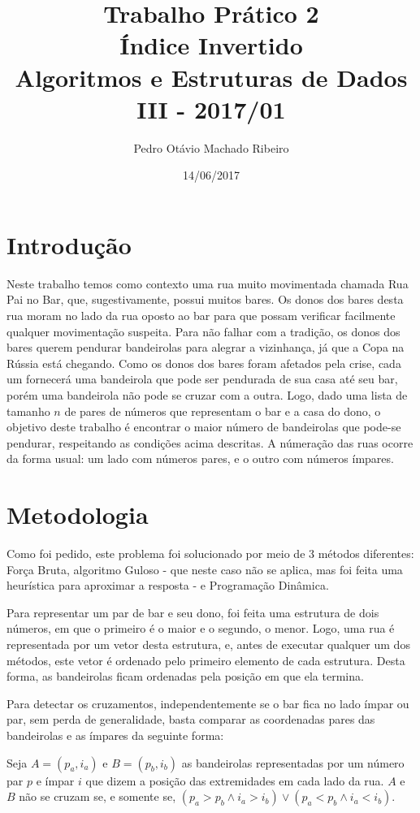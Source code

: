 \documentclass[
	12pt,
	a4paper,
	onepage,
	brazil
]{article}
\author{Pedro Otávio Machado Ribeiro}
\title{Trabalho Prático 2\\Índice Invertido\\Algoritmos e Estruturas de Dados III - 2017/01}
\date{14/06/2017}
\begin{document}
	\maketitle
	
	\section{Introdução}
	
	Neste trabalho temos como contexto uma rua muito movimentada chamada Rua Pai no Bar, que, sugestivamente, possui muitos bares. Os donos dos bares desta rua moram no lado da rua oposto ao bar para que possam verificar facilmente qualquer movimentação suspeita. Para não falhar com a tradição, os donos dos bares querem pendurar bandeirolas para alegrar a vizinhança, já que a Copa na Rússia está chegando. Como os donos dos bares foram afetados pela crise, cada um fornecerá uma bandeirola que pode ser pendurada de sua casa até seu bar, porém uma bandeirola não pode se cruzar com a outra. Logo, dado uma lista de tamanho $n$ de pares de números que representam o bar e a casa do dono, o objetivo deste trabalho é encontrar o maior número de bandeirolas que pode-se pendurar, respeitando as condições acima descritas. A númeração das ruas ocorre da forma usual: um lado com números pares, e o outro com números ímpares.
	
	\section{Metodologia}
	
	Como foi pedido, este problema foi solucionado por meio de 3 métodos diferentes: Força Bruta, algoritmo Guloso - que neste caso não se aplica, mas foi feita uma heurística para aproximar a resposta - e Programação Dinâmica.
	
	Para representar um par de bar e seu dono, foi feita uma estrutura de dois números, em que o primeiro é o maior e o segundo, o menor. Logo, uma rua é representada por um vetor desta estrutura, e, antes de executar qualquer um dos métodos, este vetor é ordenado pelo primeiro elemento de cada estrutura. Desta forma, as bandeirolas ficam ordenadas pela posição em que ela termina.
	
	Para detectar os cruzamentos, independentemente se o bar fica no lado ímpar ou par, sem perda de generalidade, basta comparar as coordenadas pares das bandeirolas e as ímpares da seguinte forma:
	
	Seja $A = (p_a, i_a)$ e $B = (p_b, i_b)$ as bandeirolas representadas por um número par $p$ e ímpar $i$ que dizem a posição das extremidades em cada lado da rua. $A$ e $B$ não se cruzam se, e somente se, $(p_a > p_b \land i_a > i_b) \lor (p_a < p_b \land i_a < i_b)$.
	
\end{document}
